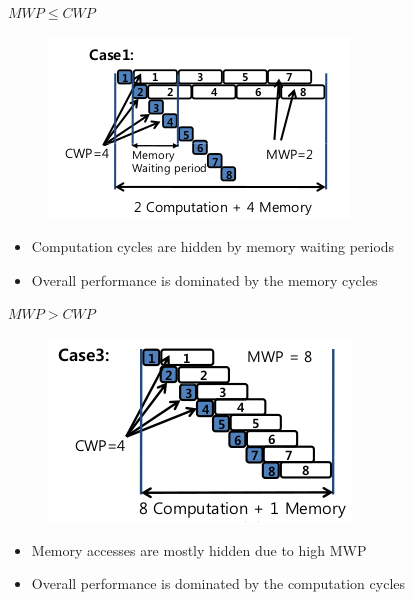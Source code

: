 \begin{frame}{$MWP \leq CWP$}
	\begin{block}{}
        \begin{center}
            \begin{figure}[H]
                \includegraphics[scale=0.65]{figures/cwpgreater.png}
            \end{figure}
        \end{center}
        \begin{itemize}
            \item Computation cycles are hidden by memory waiting periods
            \item Overall performance is dominated by the memory cycles
        \end{itemize}
    \end{block}
\end{frame}

\begin{frame}{$MWP > CWP$}
	\begin{block}{}
        \begin{center}
            \begin{figure}[H]
                \includegraphics[scale=0.65]{figures/mwpgreater.png}
            \end{figure}
        \end{center}
        \begin{itemize}
            \item Memory accesses are mostly hidden due to high MWP
            \item Overall performance is dominated by the computation cycles
        \end{itemize}
    \end{block}
\end{frame}

